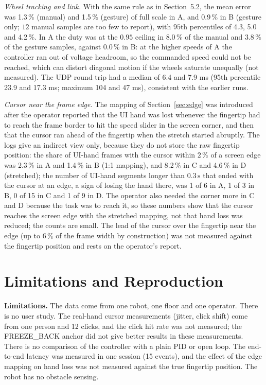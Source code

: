 \documentclass[11pt,a4paper]{article}
\begin{document}
\emph{Wheel tracking and link.} With the same rule as in Section~5.2, the mean error was 1.3\,\% (manual) and 1.5\,\% (gesture) of full scale in A, and 0.9\,\% in B (gesture only; $12$ manual samples are too few to report), with $95$th percentiles of 4.3, 5.0 and 4.2\,\%. In A the duty was at the $0.95$ ceiling in 8.0\,\% of the manual and 3.8\,\% of the gesture samples, against 0.0\,\% in B: at the higher speeds of A the controller ran out of voltage headroom, so the commanded speed could not be reached, which can distort diagonal motion if the wheels saturate unequally (not measured). The UDP round trip had a median of 6.4 and 7.9 ms (95th percentile 23.9 and 17.3 ms; maximum 104 and 47 ms), consistent with the earlier runs.

\emph{Cursor near the frame edge.} The mapping of Section~\ref{sec:edge} was introduced after the operator reported that the UI hand was lost whenever the fingertip had to reach the frame border to hit the speed slider in the screen corner, and then that the cursor ran ahead of the fingertip when the stretch started abruptly. The logs give an indirect view only, because they do not store the raw fingertip position: the share of UI-hand frames with the cursor within $2\,\%$ of a screen edge was 2.3\,\% in A and 1.4\,\% in B (1:1 mapping), and 8.2\,\% in C and 4.6\,\% in D (stretched); the number of UI-hand segments longer than $0.3\,\mathrm{s}$ that ended with the cursor at an edge, a sign of losing the hand there, was 1 of 6 in A, 1 of 3 in B, 0 of 15 in C and 1 of 9 in D. The operator also needed the corner more in C and D because the task was to reach it, so these numbers show that the cursor reaches the screen edge with the stretched mapping, not that hand loss was reduced; the counts are small. The lead of the cursor over the fingertip near the edge (up to $6\,\%$ of the frame width by construction) was not measured against the fingertip position and rests on the operator's report.

\section{Limitations and Reproduction}
\textbf{Limitations.} The data come from one robot, one floor and one operator. There is no user study. The real-hand cursor measurements (jitter, click shift) come from one person and 12 clicks, and the click hit rate was not measured; the FREEZE\_BACK anchor did not give better results in these measurements. There is no comparison of the controller with a plain PID or open loop. The end-to-end latency was measured in one session (15 events), and the effect of the edge mapping on hand loss was not measured against the true fingertip position. The robot has no obstacle sensing.
\end{document}
